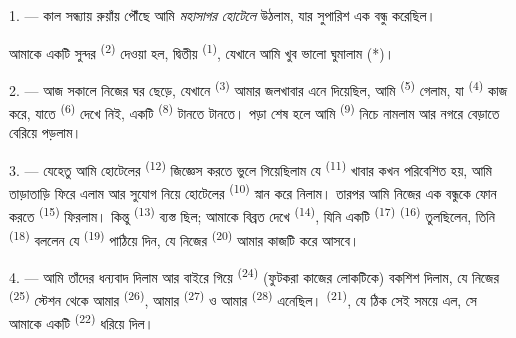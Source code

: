 %
%


\VUsaut{3.0mm}
\VUsaut{1.6mm}
\VUsaut{2.0mm}
\VUsaut{3.4mm}

1. --- কাল সন্ধ্যায় রুয়াঁয় পৌঁছে আমি \textit{মহাসাগর হোটেলে} উঠলাম, যার
সুপারিশ এক বন্ধু করেছিল।

আমাকে একটি সুন্দর  \textsuperscript{(2)} দেওয়া হল, দ্বিতীয়
 \textsuperscript{(1)}, যেখানে আমি খুব ভালো ঘুমালাম (*)।

2. --- আজ সকালে নিজের ঘর ছেড়ে, যেখানে  \textsuperscript{(3)}
আমার জলখাবার এনে দিয়েছিল, আমি  \textsuperscript{(5)}
গেলাম, যা  \textsuperscript{(4)} কাজ করে, যাতে
 \textsuperscript{(6)} দেখে নিই, একটি 
\textsuperscript{(8)} টানতে টানতে। পড়া শেষ হলে আমি 
\textsuperscript{(9)} নিচে নামলাম আর নগরে বেড়াতে বেরিয়ে পড়লাম।

3. --- যেহেতু আমি হোটেলের  \textsuperscript{(12)} জিজ্ঞেস করতে
ভুলে গিয়েছিলাম যে  \textsuperscript{(11)} খাবার কখন
পরিবেশিত হয়, আমি তাড়াতাড়ি ফিরে এলাম আর সুযোগ নিয়ে হোটেলের
 \textsuperscript{(10)} স্নান করে নিলাম। তারপর আমি নিজের এক
বন্ধুকে ফোন করতে  \textsuperscript{(15)} ফিরলাম। কিন্তু
 \textsuperscript{(13)} ব্যস্ত ছিল; আমাকে বিব্রত দেখে
 \textsuperscript{(14)}, যিনি একটি 
\textsuperscript{(17)}  \textsuperscript{(16)} তুলছিলেন, তিনি
 \textsuperscript{(18)} বললেন যে 
\textsuperscript{(19)} পাঠিয়ে দিন, যে নিজের 
\textsuperscript{(20)} আমার কাজটি করে আসবে।

4. --- আমি তাঁদের ধন্যবাদ দিলাম আর বাইরে গিয়ে 
\textsuperscript{(24)} (ফুটকরা কাজের লোকটিকে) বকশিশ দিলাম, যে নিজের
 \textsuperscript{(25)} স্টেশন থেকে আমার 
\textsuperscript{(26)}, আমার  \textsuperscript{(27)} ও আমার
 \textsuperscript{(28)} এনেছিল। 
\textsuperscript{(21)}, যে ঠিক সেই সময়ে এল, সে আমাকে একটি 
\textsuperscript{(22)} ধরিয়ে দিল।

